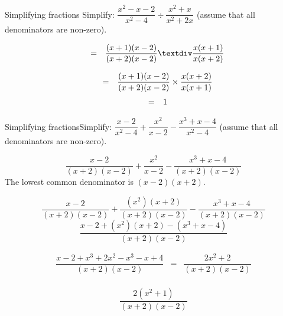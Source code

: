 \begin{wex}{Simplifying fractions}
{Simplify: $\dfrac{{x}^{2}-x-2}{{x}^{2}-4}÷\dfrac{{x}^{2}+x}{{x}^{2}+2x}$  (assume that all denominators are non-zero).} {
\begin{equation*}
\begin{array}{ccc}& =& \dfrac{(x+1)(x-2)}{(x+2)(x-2)}÷\dfrac{x(x+1)}{x(x+2)}\hfill \end{array}
\end{equation*}


\begin{equation*}
\begin{array}{ccc}& =& \dfrac{(x+1)(x-2)}{(x+2)(x-2)}\ensuremath{\times}\dfrac{x(x+2)}{x(x+1)}\hfill \end{array}
\end{equation*}
\begin{equation*}
\begin{array}{ccc}& =& 1\hfill \end{array}
\end{equation*}
}
\end{wex}

      
\begin{wex}{Simplifying fractions}{Simplify: $\dfrac{x-2}{{x}^{2}-4}+\dfrac{{x}^{2}}{x-2}-\dfrac{{x}^{3}+x-4}{{x}^{2}-4}$ 
(assume that all denominators are non-zero).}
{
\begin{equation*}
\frac{x-2}{(x+2)(x-2)}+\frac{{x}^{2}}{x-2}-\frac{{x}^{3}+x-4}{(x+2)(x-2)}
\end{equation*}
 The lowest common denominator is $(x-2)(x+2)$. 

\begin{equation*}
\frac{x-2}{(x+2)(x-2)}+\frac{({x}^{2})
(x+2)}{(x+2)(x-2)}-\frac{{x}^{3}+x-4}{(x+2)(x-2)}
\end{equation*}
\begin{equation*}
\frac{x-2+({x}^{2})(x+2)-(x^{3}+x-4)}{(x+2)(x-2)}
\end{equation*}

\begin{equation*}
 \begin{array}{llll}
\dfrac{x-2+{x}^{3}+ 2x^{2}-x^{3} - x+4}{(x+2)(x-2)} & = & \dfrac{2x^{2} + 2}{(x+2)(x-2)}\\
\end{array}
\end{equation*}

\begin{equation*}
\dfrac{2({x}^{2}
+1)}{(x+2)(x-2)}
\end{equation*}
}
\end{wex}

